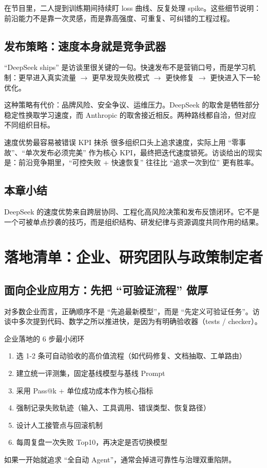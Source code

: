 \documentclass[a4paper]{article}
\begin{document}
在节目里，二人提到训练期间持续盯 loss 曲线、反复处理 spike。这些细节说明：前沿能力不是靠一次灵感，而是靠高强度、可重复、可纠错的工程过程。

\subsection{发布策略：速度本身就是竞争武器}

``DeepSeek ships'' 是访谈里很关键的一句。快速发布不是营销口号，而是学习机制：更早进入真实流量 $\to$ 更早发现失败模式 $\to$ 更快修复 $\to$ 更快进入下一轮优化。

这种策略有代价：品牌风险、安全争议、运维压力。DeepSeek 的取舍是牺牲部分稳定性换取学习速度，而 Anthropic 的取舍接近相反。两种路线都自洽，但对应不同组织目标。

\begin{warningbox}{速度优势最容易被错误 KPI 抹杀}
很多组织口头上追求速度，实际上用 ``零事故''、``单次发布必须完美'' 作为核心 KPI，最终把迭代速度锁死。访谈给出的现实是：前沿竞争期里，``可控失败 + 快速恢复'' 往往比 ``追求一次到位'' 更有胜率。
\end{warningbox}

\subsection{本章小结}

DeepSeek 的速度优势来自跨层协同、工程化高风险决策和发布反馈闭环。它不是一个可被单点抄袭的技巧，而是组织结构、研发纪律与资源调度共同作用的结果。

\section{落地清单：企业、研究团队与政策制定者}

\subsection{面向企业应用方：先把 ``可验证流程'' 做厚}

对多数企业而言，正确顺序不是 ``先追最新模型''，而是 ``先定义可验证任务''。访谈中多次提到代码、数学之所以推进快，是因为有明确验收器（tests / checker）。

\begin{importantbox}{企业落地的 6 步最小闭环}
\begin{enumerate}
    \item 选 1-2 条可自动验收的高价值流程（如代码修复、文档抽取、工单路由）
    \item 建立统一评测集，固定基线模型与基线 Prompt
    \item 采用 Pass@k + 单位成功成本作为核心指标
    \item 强制记录失败轨迹（输入、工具调用、错误类型、恢复路径）
    \item 设计人工接管点与回滚机制
    \item 每周复盘一次失败 Top10，再决定是否切换模型
\end{enumerate}

如果一开始就追求 ``全自动 Agent''，通常会掉进可靠性与治理双重陷阱。
\end{importantbox}
\end{document}
